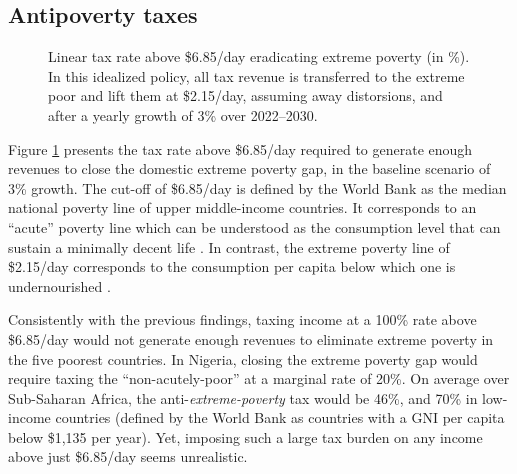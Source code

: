 \documentclass[12pt,english]{article}
\begin{document}
\subsection{Antipoverty taxes\label{subsec:tax}}

\begin{figure}[b!]
  \caption[Anti-\textit{extreme-poverty} tax above \$6.85/day in 2030 after 3\% growth.]{Linear tax rate above \$6.85/day eradicating extreme poverty (in \%). In this idealized policy, all tax revenue is transferred to the extreme poor and lift them at \$2.15/day, assuming away distorsions, and after a yearly growth of 3\% over 2022--2030. 
  }\label{fig:antipoverty_tax_7}
\end{figure}

Figure \ref{fig:antipoverty_tax_7} presents the tax rate above \$6.85/day required to generate enough revenues to close the domestic extreme poverty gap, in the baseline scenario of 3\% growth. %
The cut-off of \$6.85/day is defined by the World Bank as the median national poverty line of upper middle-income countries. It corresponds to an ``acute'' poverty line which can be understood as the consumption level that can sustain a minimally decent life \citep{hickel_is_2019,kikstra_decent_2021}. In contrast, the extreme poverty line of \$2.15/day corresponds to the consumption per capita below which one is undernourished \citep{allen_absolute_2017}. 

Consistently with the previous findings, taxing income at a 100\% rate above \$6.85/day would not generate enough revenues to eliminate extreme poverty in the five poorest countries. In Nigeria, closing the extreme poverty gap would require taxing the ``non-acutely-poor'' at a marginal rate of 20\%. 
On average over Sub-Saharan Africa, the anti-\textit{extreme-poverty} tax would be 46\%, and 70\% in low-income countries (defined by the World Bank as countries with a GNI per capita below \$1,135 per year). Yet, imposing such a large tax burden on any income above just \$6.85/day seems unrealistic. 
\end{document}
